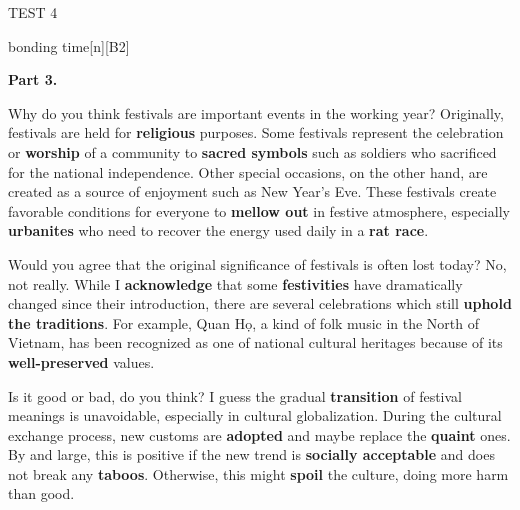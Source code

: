 \begin{glossarymc}[Cambridge 5]
\begin{test}{TEST 4}
\begin{VocabExplain}[Part 2]
            \begin{ExplainCard}{bonding time}[n][B2]
            \end{ExplainCard}
        \end{VocabExplain}

    \noindent
    \textbf{Part 3.}
    \begin{qa}{Why do you think festivals are important events in the working year?}
    Originally, festivals are held for \textbf{religious} purposes. Some festivals represent the celebration or \textbf{worship} of a community to \textbf{sacred symbols} such as soldiers who sacrificed for the national independence. Other special occasions, on the other hand, are created as a source of enjoyment such as New Year’s Eve. These festivals create favorable conditions for everyone to \textbf{mellow out} in festive atmosphere, especially \textbf{urbanites} who need to recover the energy used daily in a \textbf{rat race}.
    \end{qa}

    \begin{qa}{Would you agree that the original significance of festivals is often lost today?}
    No, not really. While I \textbf{acknowledge} that some \textbf{festivities} have dramatically changed since their introduction, there are several celebrations which still \textbf{uphold the traditions}. For example, Quan Họ, a kind of folk music in the North of Vietnam, has been recognized as one of national cultural heritages because of its \textbf{well-preserved} values.
    \end{qa}

    \begin{qa}{Is it good or bad, do you think?}
    I guess the gradual \textbf{transition} of festival meanings is unavoidable, especially in cultural globalization. During the cultural exchange process, new customs are \textbf{adopted} and maybe replace the \textbf{quaint} ones. By and large, this is positive if the new trend is \textbf{socially acceptable} and does not break any \textbf{taboos}. Otherwise, this might \textbf{spoil} the culture, doing more harm than good.
    \end{qa}


\end{test}
\end{glossarymc}
